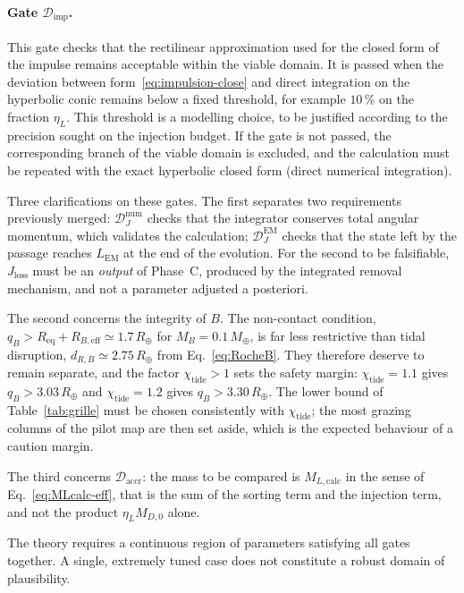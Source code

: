 \documentclass[11pt,a4paper,openany]{report}
\newcommand{\Mt}{M_{\oplus}}
\newcommand{\Rt}{R_{\oplus}}
\newcommand{\Req}{R_{\mathrm{eq}}}
\begin{document}
\paragraph{Gate $\mathcal{D}_{\mathrm{imp}}$.}
This gate checks that the rectilinear approximation used for the closed form of the impulse remains
acceptable within the viable domain. It is passed when the deviation between
form~\eqref{eq:impulsion-close} and direct integration on the hyperbolic conic remains below a fixed
threshold, for example $10\,\%$ on the fraction $\eta_L$. This threshold is a modelling choice, to
be justified according to the precision sought on the injection budget. If the gate is not passed,
the corresponding branch of the viable domain is excluded, and the calculation must be repeated
with the exact hyperbolic closed form (direct numerical integration).

Three clarifications on these gates. The first separates two requirements previously merged:
$\mathcal{D}_J^{\mathrm{num}}$ checks that the integrator conserves total angular momentum, which
validates the calculation; $\mathcal{D}_J^{\mathrm{EM}}$ checks that the state left by the passage
reaches $L_{\mathrm{EM}}$ at the end of the evolution. For the second to be falsifiable,
$J_{\mathrm{loss}}$ must be an \emph{output} of Phase~C, produced by the integrated removal
mechanism, and not a parameter adjusted a posteriori.

The second concerns the integrity of $B$. The non-contact condition,
$q_B>\Req+R_{B,\mathrm{eff}}\simeq1.7\,\Rt$ for $M_B=0.1\,\Mt$, is far less restrictive than tidal
disruption, $d_{R,B}\simeq2.75\,\Rt$ from Eq.~\eqref{eq:RocheB}. They therefore deserve to remain
separate, and the factor $\chi_{\mathrm{tide}}>1$ sets the safety margin:
$\chi_{\mathrm{tide}}=1.1$ gives $q_B>3.03\,\Rt$ and $\chi_{\mathrm{tide}}=1.2$ gives
$q_B>3.30\,\Rt$. The lower bound of Table~\ref{tab:grille} must be chosen consistently with
$\chi_{\mathrm{tide}}$; the most grazing columns of the pilot map are then set aside, which is the
expected behaviour of a caution margin.

The third concerns $\mathcal{D}_{\mathrm{accr}}$: the mass to be compared is $M_{L,\mathrm{calc}}$
in the sense of Eq.~\eqref{eq:MLcalc-eff}, that is the sum of the sorting term and the injection
term, and not the product $\eta_L M_{D,0}$ alone.

\begin{falsif}
The theory requires a continuous region of parameters satisfying all gates together. A single,
extremely tuned case does not constitute a robust domain of plausibility.
\end{falsif}
\end{document}
